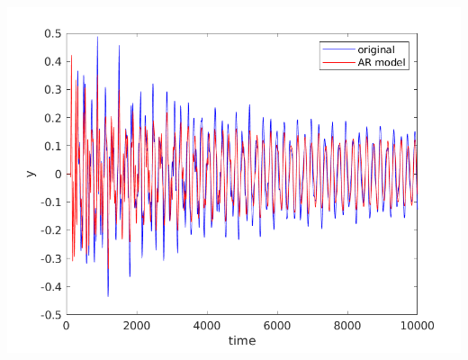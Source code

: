 \documentclass[10pt,a4paper,openright]{article}
\begin{document}
\subsection{}
\includegraphics[scale=0.8]{graph.png}
\end{document}
